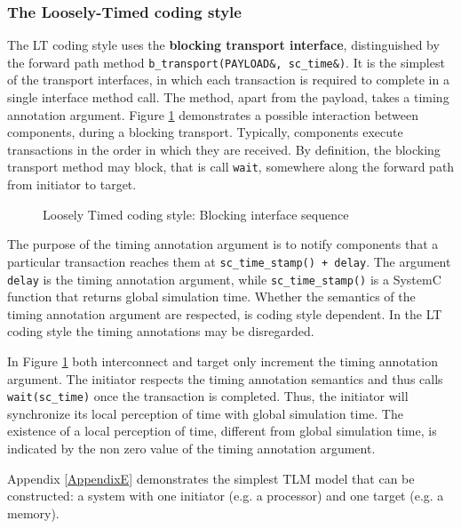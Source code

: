 \documentclass[11pt]{article}
\begin{document}
\subsubsection{The Loosely-Timed coding style}
\label{sec:org5d3b933}
The LT coding style uses the \textbf{blocking transport interface}, distinguished by the forward path method \texttt{b\_transport(PAYLOAD&, sc\_time&)}.
It is the simplest of the transport interfaces, in which each transaction is required to complete in a single interface method call.
The method, apart from the payload, takes a timing annotation argument.
Figure \ref{fig:sequence} demonstrates a possible interaction between components, during a blocking transport.
Typically, components execute transactions in the order in which they are received.
By definition, the blocking transport method may block, that is call \texttt{wait}, somewhere along the forward path from initiator to target.

\begin{figure}[htpb]
\centering

\caption{Loosely Timed coding style: Blocking interface sequence} 
\label{fig:sequence}
\end{figure}

The purpose of the timing annotation argument is to notify components that a particular transaction reaches them at \texttt{sc\_time\_stamp() + delay}.
The argument \texttt{delay} is the timing annotation argument, while \texttt{sc\_time\_stamp()} is a SystemC function that returns global simulation time.
Whether the semantics of the timing annotation argument are respected, is coding style dependent.
In the LT coding style the timing annotations may be disregarded.

In Figure \ref{fig:sequence} both interconnect and target only increment the timing annotation argument.
The initiator respects the timing annotation semantics and thus calls \texttt{wait(sc\_time)} once the transaction is completed.
Thus, the initiator will synchronize its local perception of time with global simulation time.
The existence of a local perception of time, different from global simulation time, is indicated by the non zero value of the timing annotation argument.

Appendix \ref{AppendixE} demonstrates the simplest TLM model that can be constructed: a system with one initiator (e.g. a processor) and one target (e.g. a memory).
\end{document}
